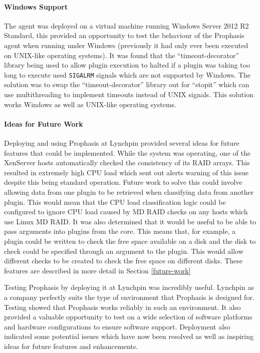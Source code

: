 \documentclass[bsc,deptreport,twoside,parskip,singlespacing,notimes]{infthesis}
\begin{document}
\paragraph*{Windows Support}
	The agent was deployed on a virtual machine running Windows Server 2012 R2
	Standard, this provided an opportunity to test the behaviour of the Prophasis
	agent when running under Windows (previously it had only ever been executed on
	UNIX-like operating systems).  It was found that the ``timeout-decorator''
	library being used to allow plugin execution to halted if a plugin was taking
	too long to execute used \texttt{SIGALRM} signals which are not supported by
	Windows. The solution was to swap the ``timeout-decorator'' library out for
	``stopit'' which can use multithreading to implement timeouts instead of UNIX
	signals.  This solution works Windows as well as UNIX-like operating systems.

\paragraph*{Ideas for Future Work}
	Deploying and using Prophasis at Lynchpin provided several ideas for future
	features that could be implemented.  While the system
	was operating, one of the XenServer hosts automatically checked the consistency of
	its RAID arrays.  This resulted in extremely high CPU load which sent out
	alerts warning of this issue despite this being standard operation. Future work
	to solve this could involve allowing data from one plugin to be retrieved when
	classifying data from another plugin. This would mean that the CPU load
	classification logic could be configured to ignore CPU load caused by MD RAID
	checks on any hosts which use Linux MD RAID. It was also determined that it
	would be useful to be able to pass arguments into plugins from the core.  This
	means that, for example, a plugin could be written to check the free space
	available on a disk and the disk to check could be specified through an
	argument to the plugin. This would allow different checks to be created to
	check the free space on different disks.  These features are described in more
	detail in Section \ref{future-work}


	Testing Prophasis by deploying it at Lynchpin was incredibly useful. Lynchpin
	as a company perfectly suits the type of environment that Prophasis is designed
	for. Testing showed that Prophasis works reliably in such an environment.  It also
	provided a valuable opportunity to test on a wide selection of software
	platforms and hardware configurations to ensure software support.  Deployment
	also indicated some potential issues which have now been resolved as well as
	inspiring ideas for future features and enhancements.
\end{document}
